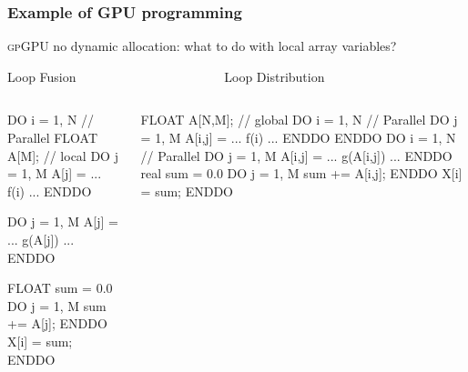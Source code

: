 \documentclass{beamer}
\newcommand{\emp}[1]{\textcolor{DikuRed}{ #1}}
\newcommand{\emphh}[1]{\textcolor{CosGreen}{ #1}}
\begin{document}
\begin{frame}[fragile,t]
  \frametitle{Example of GPU programming} %

\smallskip
\emp{\textsc{gpGPU} no dynamic allocation: what to do with local array variables?}

\pause
\smallskip

\begin{block}{ Loop Fusion $\mbox{~~~~~~~~~~~~~~~~~~~~~~~~~~~~~~~~~}$ Loop Distribution }
\begin{columns}
\vspace{-2ex}
\begin{colorcode}[fontsize=\scriptsize]
DO i = 1, N   \emphh{// Parallel}
  FLOAT A[M];  \emp{// local}
  DO j = 1, M  
    A[j] = ... f(i) ...
  ENDDO

  DO j = 1, M  
    A[j] = ... g(A[j]) ...
  ENDDO

  FLOAT sum = 0.0
  DO j = 1, M
    sum += A[j];
  ENDDO
  X[i] = sum;
ENDDO
\end{colorcode} 
\vspace{-2ex}
\begin{colorcode}[fontsize=\scriptsize]
FLOAT A[N,M];  \emp{// global}
DO i = 1, N   \emphh{// Parallel}
  DO j = 1, M  
    A[i,j] = ... f(i) ...
  ENDDO
ENDDO
DO i = 1, N   \emphh{// Parallel}
  DO j = 1, M  
    A[i,j] = ... g(A[i,j]) ...
  ENDDO
  real sum = 0.0
  DO j = 1, M
    sum += A[i,j];
  ENDDO
  X[i] = sum;
ENDDO
\end{colorcode}
\end{columns}
\end{block}

\end{frame}


\end{document}
